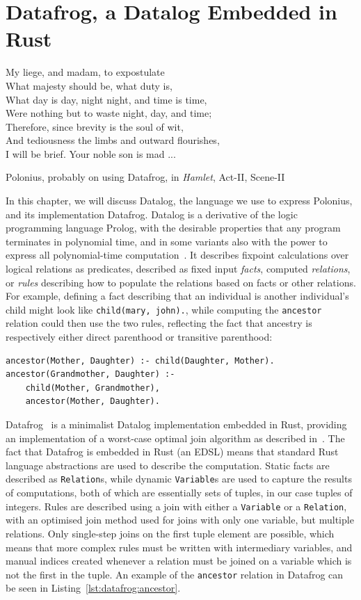 \documentclass[11pt,a4paper,twoside,openany]{report}
\newcommand{\InRust}[1]{\texttt{#1}}
\newcommand{\InDatalog}[1]{\texttt{#1}}
\begin{document}
\chapter{Datafrog, a Datalog Embedded in Rust}\label{cha:datalog}

\epigraph{My liege, and madam, to expostulate\\
  What majesty should be, what duty is,\\
  What day is day, night night, and time is time,\\
  Were nothing but to waste night, day, and time;\\
  Therefore, since brevity is the soul of wit,\\
  And tediousness the limbs and outward flourishes,\\
  I will be brief. Your noble son is mad ...}{Polonius, probably on using
  Datafrog, in \textit{Hamlet}, Act-II, Scene-II}

In this chapter, we will discuss Datalog, the language we use to express
Polonius, and its implementation Datafrog. Datalog is a derivative of the logic
programming language Prolog, with the desirable properties that any program
terminates in polynomial time, and in some variants also with the power to
express all polynomial-time computation~\cite{afrati_datalog_1995}. It describes
fixpoint calculations over logical relations as predicates, described as fixed
input \emph{facts}, computed \emph{relations}, or \emph{rules} describing how to
populate the relations based on facts or other relations. For example, defining
a fact describing that an individual is another individual's child might look
like \InDatalog{child(mary, john).}, while computing the \InDatalog{ancestor}
relation could then use the two rules, reflecting the fact that ancestry is
respectively either direct parenthood or transitive parenthood:
\begin{verbatim}
ancestor(Mother, Daughter) :- child(Daughter, Mother).
ancestor(Grandmother, Daughter) :- 
    child(Mother, Grandmother),
    ancestor(Mother, Daughter).
\end{verbatim}

Datafrog~\cite{datafrog} is a minimalist Datalog implementation embedded in
Rust, providing an implementation of a worst-case optimal join algorithm as
described in~\cite{ngo_worst-case_2012}. The fact that Datafrog is embedded in
Rust (an EDSL) means that standard Rust language abstractions are used to
describe the computation. Static facts are described as \InRust{Relation}s,
while dynamic \InRust{Variable}s are used to capture the results of
computations, both of which are essentially sets of tuples, in our case tuples
of integers. Rules are described using a join with either a \InRust{Variable} or
a \InRust{Relation}, with an optimised join method used for joins with only one
variable, but multiple relations. Only single-step joins on the first tuple
element are possible, which means that more complex rules must be written with
intermediary variables, and manual indices created whenever a relation must be
joined on a variable which is not the first in the tuple. An example of the
\InDatalog{ancestor} relation in Datafrog can be seen in
Listing~\ref{lst:datafrog:ancestor}.
\end{document}
